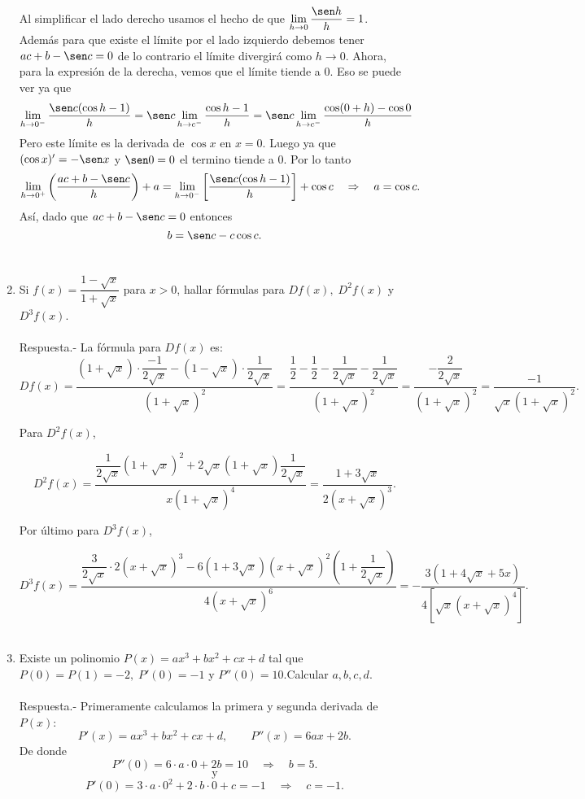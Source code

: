 \begin{enumerate}[\bfseries 1.]
	Al simplificar el lado derecho usamos el hecho de que $\lim\limits_{h\to 0}\dfrac{\sen h}{h}=1$. Además para que existe el límite por el lado izquierdo debemos tener $ac+b-\sen c = 0$ de lo contrario el límite divergirá como $h\to 0$. Ahora, para la expresión de la derecha, vemos que el límite tiende a $0$. Eso se puede ver ya que 
	$$\lim_{h\to 0^-}\dfrac{\sen c(\cos h - 1)}{h}=\sen c \lim_{h\to c^-}\dfrac{\cos h - 1}{h} = \sen c \lim_{h\to c^-}\dfrac{\cos(0+h)-\cos 0}{h}$$
	Pero este límite es la derivada de $\cos x$ en $x=0$. Luego ya que $(\cos x)'=-\sen x$ y $\sen 0 =0$ el termino tiende a $0$. Por lo tanto
	$$\lim\limits_{h\to 0^+} \left(\dfrac{ac + b-\sen c}{h}\right)+a = \lim\limits_{h\to 0^-} \left[\dfrac{\sen c ( \cos h -1)}{h}\right] + \cos c \quad \Rightarrow \quad a=\cos c.$$
	Así, dado que $ac+b-\sen c=0$ entonces 
	$$b=\sen c - c\cos c.$$\\

    \item Si $f(x)=\dfrac{1-\sqrt{x}}{1+\sqrt{x}}$ para $x>0$, hallar fórmulas para $Df(x),\; D^2f(x)$ y $D^3f(x)$.\\\\
	Respuesta.- \; La fórmula para $Df(x)$ es:
	$$Df(x)=\dfrac{(1+\sqrt{x})\cdot \dfrac{-1}{2\sqrt{x}}- (1-\sqrt{x})\cdot \dfrac{1}{2\sqrt{x}}}{(1+\sqrt{x})^2} = \dfrac{\dfrac{1}{2}-\dfrac{1}{2}-\dfrac{1}{2\sqrt{x}}-\dfrac{1}{2\sqrt{x}}}{(1+\sqrt{x})^2}=\dfrac{-\dfrac{2}{2\sqrt{x}}}{(1+\sqrt{x})^2} =\dfrac{-1}{\sqrt{x}(1+\sqrt{x})^2}.$$

	Para $D^2f(x)$,

	$$D^2f(x)=\dfrac{\dfrac{1}{2\sqrt{x}}(1+\sqrt{x})^2+2\sqrt{x}(1+\sqrt{x})\dfrac{1}{2\sqrt{x}}}{x(1+\sqrt{x})^4} = \dfrac{1+3\sqrt{x}}{2(x+\sqrt{x})^3}.$$

	Por último para $D^3f(x)$,

	$$D^3f(x)=\dfrac{\dfrac{3}{2\sqrt{x}}\cdot 2(x+\sqrt{x})^3-6(1+3\sqrt{x})(x+\sqrt{x})^2\left(1+\dfrac{1}{2\sqrt{x}}\right)}{4(x+\sqrt{x})^6}=- \dfrac{3(1+4\sqrt{x}+5x)}{4\left[\sqrt{x}(x+\sqrt{x})^4\right]}.$$\\

    \item Existe un polinomio $P(x)=ax^3+bx^2+cx+d$ tal que $P(0)=P(1)=-2,\; P'(0)=-1$ y $P''(0)=10.$Calcular $a,b,c,d.$\\\\
	Respuesta.-\; Primeramente calculamos la primera y segunda derivada de $P(x)$:
	$$P'(x)=ax^3+bx^2+cx+d,\qquad P''(x)=6ax+2b.$$
	De donde 
	$$P''(0)=6\cdot a\cdot 0+2b=10\quad \Rightarrow \quad b=5.$$
	$$\mbox{y}$$
	$$P'(0)=3\cdot a\cdot 0^2+2\cdot b \cdot 0 + c = -1 \quad \Rightarrow \quad c=-1.$$


\end{enumerate}

